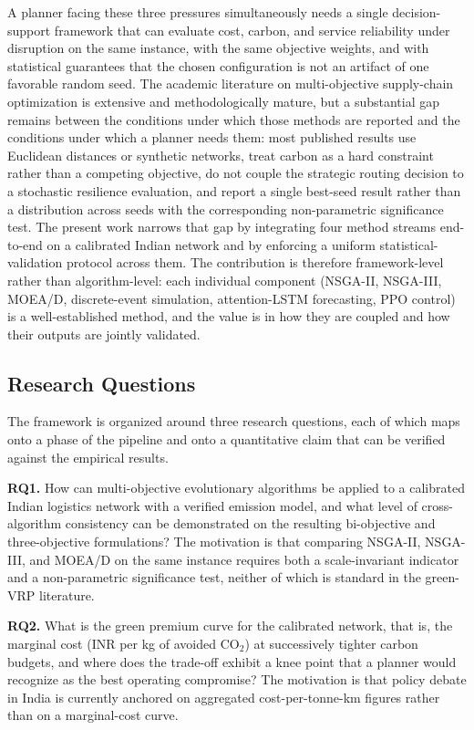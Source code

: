 \documentclass[review,preprint,authoryear,12pt]{elsarticle}
\newcommand{\COtwo}{\ensuremath{\mathrm{CO}_{2}}}
\begin{document}
A planner facing these three pressures simultaneously needs a single
decision-support framework that can evaluate cost, carbon, and service
reliability under disruption on the same instance, with the same
objective weights, and with statistical guarantees that the chosen
configuration is not an artifact of one favorable random seed. The
academic literature on multi-objective supply-chain optimization is
extensive and methodologically mature, but a substantial gap remains
between the conditions under which those methods are reported and the
conditions under which a planner needs them: most published results
use Euclidean distances or synthetic networks, treat carbon as a hard
constraint rather than a competing objective, do not couple the
strategic routing decision to a stochastic resilience evaluation, and
report a single best-seed result rather than a distribution across
seeds with the corresponding non-parametric significance test. The
present work narrows that gap by integrating four method streams
end-to-end on a calibrated Indian network and by enforcing a uniform
statistical-validation protocol across them. The contribution is
therefore framework-level rather than algorithm-level: each individual
component (NSGA-II, NSGA-III, MOEA/D, discrete-event simulation,
attention-LSTM forecasting, PPO control) is a well-established method,
and the value is in how they are coupled and how their outputs are
jointly validated.

\subsection{Research Questions}

The framework is organized around three research questions, each of
which maps onto a phase of the pipeline and onto a quantitative claim
that can be verified against the empirical results.

\textbf{RQ1.} How can multi-objective evolutionary algorithms be
applied to a calibrated Indian logistics network with a verified
emission model, and what level of cross-algorithm consistency can be
demonstrated on the resulting bi-objective and three-objective
formulations? The motivation is that comparing NSGA-II, NSGA-III, and
MOEA/D on the same instance requires both a scale-invariant indicator
and a non-parametric significance test, neither of which is standard
in the green-VRP literature.

\textbf{RQ2.} What is the green premium curve for the calibrated
network, that is, the marginal cost (INR per kg of avoided \COtwo{})
at successively tighter carbon budgets, and where does the trade-off
exhibit a knee point that a planner would recognize as the best
operating compromise? The motivation is that policy debate in India
is currently anchored on aggregated cost-per-tonne-km figures rather
than on a marginal-cost curve.
\end{document}
